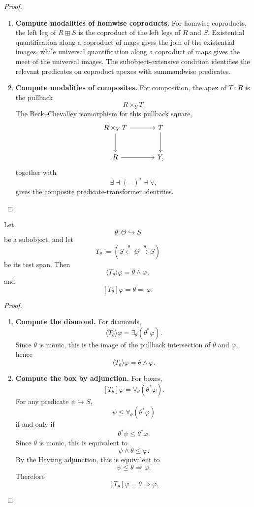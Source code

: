 \begin{proof}
\begin{enumerate}
  \item \textbf{Compute modalities of homwise coproducts.}
  For homwise coproducts, the left leg of \(R\boxplus S\) is the coproduct of
  the left legs of \(R\) and \(S\). Existential quantification along a
  coproduct of maps gives the join of the existential images, while universal
  quantification along a coproduct of maps gives the meet of the universal
  images. The subobject-extensive condition identifies the relevant predicates
  on coproduct apexes with summandwise predicates.

  \item \textbf{Compute modalities of composites.}
  For composition, the apex of \(T\circ R\) is the pullback
  \[
    R\times_Y T.
  \]
  The Beck--Chevalley isomorphism for this pullback square,
  \[
  \begin{tikzcd}[column sep=large,row sep=large]
    R\times_Y T
      \ar[r]
      \ar[d]
    &
    T
      \ar[d]
    \\
    R
      \ar[r]
    &
    Y ,
  \end{tikzcd}
  \]
  together with
  \[
    \exists\dashv(-)^\ast\dashv\forall,
  \]
  gives the composite predicate-transformer identities.
\end{enumerate}
\end{proof}

\begin{lemma}[Tests]
\label{lem:test-modalities-feedback}
Let
\[
  \theta:\Theta\hookrightarrow S
\]
be a subobject, and let
\[
  T_\theta:=
  \left(
    S\xleftarrow{\theta}\Theta\xrightarrow{\theta}S
  \right)
\]
be its test span. Then
\[
  \langle T_\theta\rangle\varphi
  =
  \theta\wedge\varphi,
\]
and
\[
  [T_\theta]\varphi
  =
  \theta\Rightarrow\varphi.
\]
\end{lemma}

\begin{proof}
\begin{enumerate}
  \item \textbf{Compute the diamond.}
  For diamonds,
  \[
    \langle T_\theta\rangle\varphi
    =
    \exists_\theta(\theta^\ast\varphi).
  \]
  Since \(\theta\) is monic, this is the image of the pullback intersection
  of \(\theta\) and \(\varphi\), hence
  \[
    \langle T_\theta\rangle\varphi
    =
    \theta\wedge\varphi.
  \]

  \item \textbf{Compute the box by adjunction.}
  For boxes,
  \[
    [T_\theta]\varphi
    =
    \forall_\theta(\theta^\ast\varphi).
  \]
  For any predicate \(\psi\hookrightarrow S\),
  \[
    \psi\leq\forall_\theta(\theta^\ast\varphi)
  \]
  if and only if
  \[
    \theta^\ast\psi\leq\theta^\ast\varphi.
  \]
  Since \(\theta\) is monic, this is equivalent to
  \[
    \psi\wedge\theta\leq\varphi.
  \]
  By the Heyting adjunction, this is equivalent to
  \[
    \psi\leq\theta\Rightarrow\varphi.
  \]
  Therefore
  \[
    [T_\theta]\varphi
    =
    \theta\Rightarrow\varphi.
  \]
\end{enumerate}
\end{proof}

